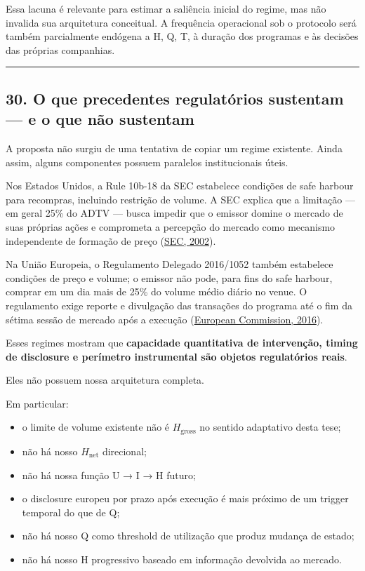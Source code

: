 \documentclass[
  a4paper,
]{article}
\providecommand{\tightlist}{%
  \setlength{\itemsep}{0pt}\setlength{\parskip}{0pt}}
\begin{document}
Essa lacuna é relevante para estimar a saliência inicial do regime, mas
não invalida sua arquitetura conceitual. A frequência operacional sob o
protocolo será também parcialmente endógena a H, Q, T, à duração dos
programas e às decisões das próprias companhias.

\begin{center}\rule{0.5\linewidth}{0.5pt}\end{center}

\hypertarget{30-o-que-precedentes-regulatorios-sustentam-e-o-que-nao-sustentam}{}

\hypertarget{30-o-que-precedentes-regulatuxf3rios-sustentam--e-o-que-nuxe3o-sustentam}{%
\subsection{30. O que precedentes regulatórios sustentam --- e o que não
sustentam}\label{30-o-que-precedentes-regulatuxf3rios-sustentam--e-o-que-nuxe3o-sustentam}}

A proposta não surgiu de uma tentativa de copiar um regime existente.
Ainda assim, alguns componentes possuem paralelos institucionais úteis.

Nos Estados Unidos, a Rule 10b-18 da SEC estabelece condições de safe
harbour para recompras, incluindo restrição de volume. A SEC explica que
a limitação --- em geral 25\% do ADTV --- busca impedir que o emissor
domine o mercado de suas próprias ações e comprometa a percepção do
mercado como mecanismo independente de formação de preço
(\protect\hyperlink{ref-10}{SEC, 2002}).

Na União Europeia, o Regulamento Delegado 2016/1052 também estabelece
condições de preço e volume; o emissor não pode, para fins do safe
harbour, comprar em um dia mais de 25\% do volume médio diário no venue.
O regulamento exige reporte e divulgação das transações do programa até
o fim da sétima sessão de mercado após a execução
(\protect\hyperlink{ref-3}{European Commission, 2016}).

Esses regimes mostram que \textbf{capacidade quantitativa de
intervenção, timing de disclosure e perímetro instrumental são objetos
regulatórios reais}.

Eles não possuem nossa arquitetura completa.

Em particular:

\begin{itemize}
\tightlist
\item
  o limite de volume existente não é \(H_{\mathrm{gross}}\) no sentido
  adaptativo desta tese;
\item
  não há nosso \(H_{\mathrm{net}}\) direcional;
\item
  não há nossa função U → I → H futuro;
\item
  o disclosure europeu por prazo após execução é mais próximo de um
  trigger temporal do que de Q;
\item
  não há nosso Q como threshold de utilização que produz mudança de
  estado;
\item
  não há nosso H progressivo baseado em informação devolvida ao mercado.
\end{itemize}
\end{document}
